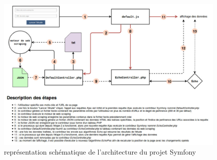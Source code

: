 \documentclass[12pt]{article}
\begin{document}
\begin{appendices}
\begin{figure}[p]
	\centering\includegraphics[scale=0.45]{architectureMachineLearning.jpg}
	\caption{représentation schématique de l'architecture du projet Symfony}
\end{figure}

\


\end{appendices}
\end{document}
